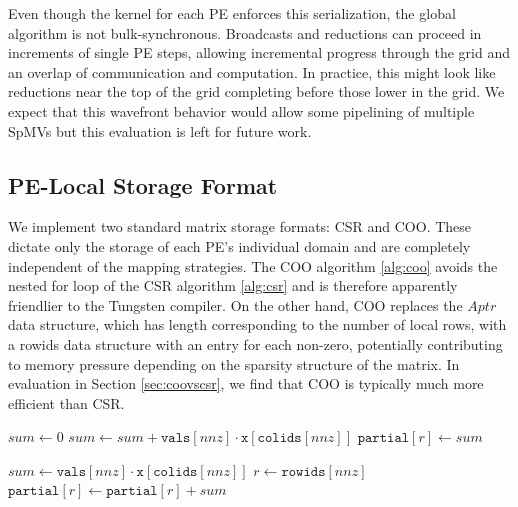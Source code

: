 \documentclass[conference]{IEEEtran}
\begin{document}
Even though the kernel for each PE enforces this serialization, the global algorithm is not bulk-synchronous. Broadcasts and reductions can proceed
in increments of single PE steps, allowing incremental progress through the grid and an overlap of communication and computation. In practice, this might look like reductions near the top of the grid completing before those lower in the grid. We expect that this wavefront behavior would allow some pipelining of multiple SpMVs but this evaluation is left for future work.

\subsection{PE-Local Storage Format}
We implement two standard matrix storage formats: CSR and COO. These dictate only the storage of each PE's individual domain and are completely independent of the mapping strategies.
The COO algorithm \ref{alg:coo} avoids the nested for loop of the CSR algorithm \ref{alg:csr} and is therefore apparently friendlier to the Tungsten compiler.
On the other hand, COO replaces the $Aptr$ data structure, which has length corresponding to the number of local rows, with
a rowids data structure with an entry for each non-zero, potentially contributing to memory pressure depending on the sparsity structure of the matrix.
In evaluation in Section \ref{sec:coovscsr}, we find that COO is typically much more efficient than CSR.

\begin{algorithm}
    \caption{SpMV Kernel in CSR Format}
    \label{alg:csr}
    \begin{algorithmic}[1]
        \State $sum \gets 0$
        \State $sum \gets sum + \texttt{vals}[nnz] \cdot \texttt{x}[ \texttt{colids}[nnz]]$
        \EndFor
        \State $\texttt{partial}[r] \gets sum$
        \EndFor
    \end{algorithmic}
\end{algorithm}

\begin{algorithm}
    \caption{SpMV Kernel in COO Format}
    \label{alg:coo}
    \begin{algorithmic}[1]
        \State $sum \gets \texttt{vals}[nnz] \cdot \texttt{x} [\texttt{colids}[nnz]]$
        \State $r \gets \texttt{rowids}[nnz]$
        \State $\texttt{partial}[r] \gets \texttt{partial}[r] + sum$

        \EndFor
    \end{algorithmic}
\end{algorithm}
\end{document}
